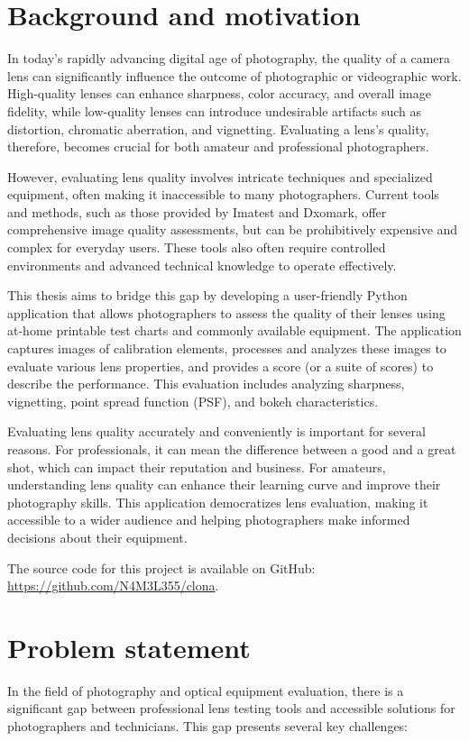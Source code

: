 \section*{Background and motivation}
In today's rapidly advancing digital age of photography, the quality of a camera lens can significantly influence the outcome of photographic or videographic work. High-quality lenses can enhance sharpness, color accuracy, and overall image fidelity, while low-quality lenses can introduce undesirable artifacts such as distortion, chromatic aberration, and vignetting. Evaluating a lens's quality, therefore, becomes crucial for both amateur and professional photographers.

However, evaluating lens quality involves intricate techniques and specialized equipment, often making it inaccessible to many photographers. Current tools and methods, such as those provided by Imatest and Dxomark, offer comprehensive image quality assessments, but can be prohibitively expensive and complex for everyday users. These tools also often require controlled environments and advanced technical knowledge to operate effectively.

This thesis aims to bridge this gap by developing a user-friendly Python application that allows photographers to assess the quality of their lenses using at-home printable test charts and commonly available equipment. The application captures images of calibration elements, processes and analyzes these images to evaluate various lens properties, and provides a score (or a suite of scores) to describe the performance. This evaluation includes analyzing sharpness, vignetting, point spread function (PSF), and bokeh characteristics.


Evaluating lens quality accurately and conveniently is important for several reasons. For professionals, it can mean the difference between a good and a great shot, which can impact their reputation and business. For amateurs, understanding lens quality can enhance their learning curve and improve their photography skills. This application democratizes lens evaluation, making it accessible to a wider audience and helping photographers make informed decisions about their equipment.



The source code for this project is available on GitHub: \url{https://github.com/N4M3L355/clona}.
\section*{Problem statement}
In the field of photography and optical equipment evaluation, there is a significant gap between professional lens testing tools and accessible solutions for photographers and technicians. This gap presents several key challenges:

